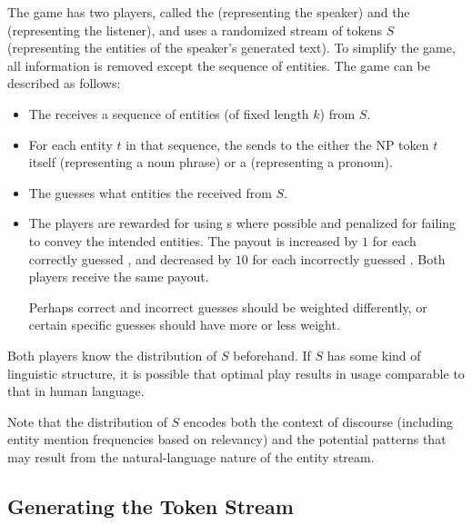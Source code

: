 \documentclass[11pt]{article}
\begin{document}
    The game has two players, called the \Generator{} (representing the speaker)
    and the \Resolver{} (representing the listener),
    and uses a randomized stream of tokens $S$ (representing the entities of the speaker's generated text).
    To simplify the game, all information is removed except the sequence of entities.
    The game can be described as follows:
    \begin{itemize}
        \item
        The \Generator{} receives a sequence of entities (of fixed length $k$) from $S$.
        \item
        For each entity $t$ in that sequence,
        the \Generator{} sends to the \Resolver{} either the NP token $t$ itself (representing a noun phrase)
        or a \Placeholder{} (representing a pronoun).
        \item
        The \Resolver{} guesses what entities the \Generator{} received from $S$.
        \item
        The players are rewarded for using \Placeholder s where possible
        and penalized for failing to convey the intended entities.
        The payout is increased by $1$ for each correctly guessed \Placeholder{},
        and decreased by $10$ for each incorrectly guessed \Placeholder{}.
        Both players receive the same payout.

        \begin{nb}
            Perhaps correct and incorrect guesses should be weighted differently,
            or certain specific guesses should have more or less weight.
        \end{nb}
    \end{itemize}

    Both players know the distribution of $S$ beforehand.
    If $S$ has some kind of linguistic structure,
    it is possible that optimal play results in \Placeholder{} usage comparable to that in human language.

    \begin{nb}
        Note that the distribution of $S$ encodes
        both the context of discourse (including entity mention frequencies based on relevancy)
        and the potential patterns that may result
        from the natural-language nature of the entity stream.
    \end{nb}

    \subsection{Generating the Token Stream}\label{subsec:generating-the-token-stream}
\end{document}
